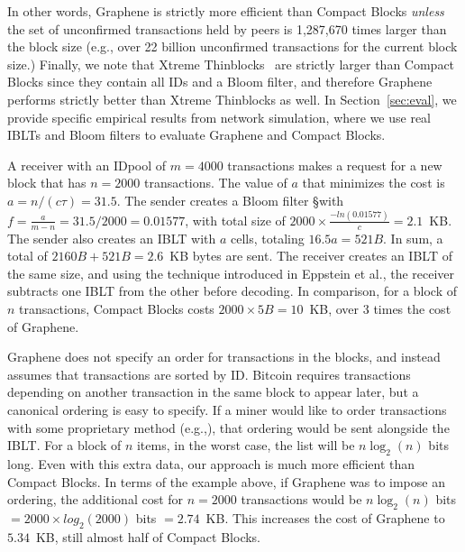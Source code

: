 In other words, Graphene is strictly more efficient than Compact Blocks {\em unless} the  set of unconfirmed transactions held by peers  is 1,287,670 times larger than the block size (e.g.,  over 22 billion unconfirmed transactions for the current block size.)  Finally, we note that Xtreme Thinblocks~\cite{Tschipper:2016} are  strictly larger than Compact Blocks since they contain all IDs and a Bloom filter, and therefore Graphene performs strictly better than Xtreme Thinblocks as well. 
%
In Section~\ref{sec:eval}, we provide specific empirical results from network simulation, where we use real IBLTs and Bloom filters to evaluate Graphene and Compact Blocks.

 A receiver with an IDpool of $m=4000$ transactions
makes a request for a new block that has $n=2000$ transactions. The
value of $a$ that minimizes the cost is $a=n/(c\tau)=31.5$. The sender
creates a Bloom filter \S with $f=\frac{a}{m-n}=31.5/2000= 0.01577$,
with total size of $2000\times \frac{-ln( 0.01577)}{c}=2.1$~KB.  The
sender also creates an IBLT with $a$ cells, totaling $16.5a=521B$. In
sum, a total of $2160B+521B=2.6$~KB bytes are sent.  The receiver
creates an IBLT of the same size, and using the technique introduced
in Eppstein et al.\cite{eppstein:2011}, the receiver subtracts one
IBLT from the other before decoding. In comparison, for a block of $n$ transactions, Compact Blocks costs $2000\times5B = 10$~KB, over 3 times the cost of Graphene. 


 Graphene does not specify an order for transactions
in the blocks, and instead assumes that transactions are sorted by
ID. Bitcoin requires transactions depending on another transaction in
the same block to appear later, but a canonical ordering is easy to
specify. If a miner would like to order transactions with some
proprietary method (e.g.,\cite{Hanke:2016}), that ordering would be
sent alongside the IBLT. For a block of $n$ items, in the worst case,
the list will be $n\log_2(n)$ bits long.  Even with this extra data, our approach is much more efficient than Compact Blocks.   In terms of the example above, if Graphene was to impose an ordering, the additional cost for $n=2000$ transactions would be $n \log_2(n)$ bits $= 2000\times log_2(2000)$ bits $= 2.74$~KB. This increases the cost of Graphene to $5.34$~KB, still almost half of Compact Blocks.

